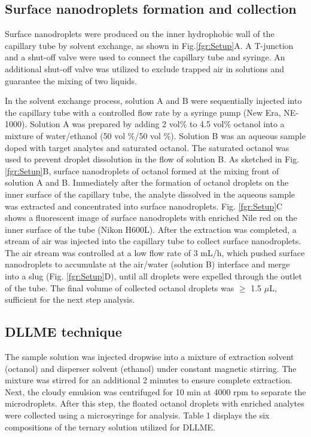 \documentclass[a4paper,fleqn]{cas-dc}
\begin{document}
\begin{sloppypar}
\subsection{Surface nanodroplets formation and collection}

Surface nanodroplets were produced on the inner hydrophobic wall of the capillary tube by solvent exchange, as shown in Fig.\ref{fgr:Setup}A. A T-junction and a shut-off valve were used to connect the capillary tube and syringe. An additional shut-off valve was utilized to exclude trapped air in solutions and guarantee the mixing of two liquids. 

In the solvent exchange process, solution A and B were sequentially injected into the capillary tube with a controlled flow rate by a  syringe pump (New Era,
NE-1000). Solution A was prepared by adding 2 vol\% to 4.5 vol\% octanol into a mixture of water/ethanol (50 vol \%/50 vol \%). Solution B was an aqueous sample doped with target analytes and saturated octanol. The saturated octanol was used to prevent droplet dissolution in the flow of solution B. As sketched in Fig. \ref{fgr:Setup}B, surface nanodroplets of octanol formed at the mixing front of solution A and B. Immediately after the formation of octanol droplets on the inner surface of the capillary tube, the analyte dissolved in the aqueous sample was extracted and concentrated into surface nanodroplets. Fig. \ref{fgr:Setup}C shows a fluorescent image of surface nanodroplets with enriched Nile red on the inner surface of the tube (Nikon H600L).   
After the extraction was completed, a stream of air was injected into the capillary tube to collect surface nanodroplets. The air stream was controlled at a low flow rate of 3 mL/h, which pushed surface nanodroplets to accumulate at the air/water (solution B) interface and merge into a slug (Fig. \ref{fgr:Setup}D), until all droplets were expelled through the outlet of the tube. The final volume of collected octanol droplets was $\geq$ 1.5 $\mu$L, sufficient for the next step analysis.

\subsection{DLLME technique}

The sample solution was injected dropwise into a mixture of extraction solvent (octanol) and disperser solvent (ethanol) under constant magnetic stirring. The mixture was stirred for an additional 2 minutes to ensure complete extraction. Next, the cloudy emulsion was centrifuged for 10 min at 4000 rpm to separate the microdroplets. After this step, the floated octanol droplets with enriched analytes were collected using a microsyringe for analysis. Table 1 displays the six compositions of the ternary solution utilized for DLLME.   


\end{sloppypar}
\end{document}
